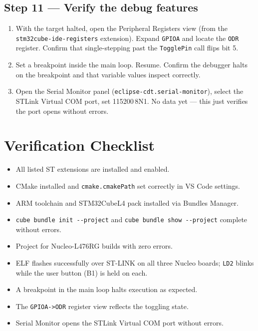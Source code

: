 \documentclass[11pt,letterpaper]{article}
\begin{document}

\newpage
\subsection{Step 11 --- Verify the debug features}
\begin{enumerate}[leftmargin=2em]
	\item With the target halted, open the Peripheral Registers view (from the \texttt{stm32cube-ide-registers} extension). Expand \texttt{GPIOA} and locate the \texttt{ODR} register. Confirm that single-stepping past the \texttt{TogglePin} call flips bit 5.
	\item Set a breakpoint inside the main loop. Resume. Confirm the debugger halts on the breakpoint and that variable values inspect correctly.
	\item Open the Serial Monitor panel (\texttt{eclipse-cdt.serial-monitor}), select the STLink Virtual COM port, set 115200\,8N1. No data yet --- this just verifies the port opens without errors.
\end{enumerate}

\section{Verification Checklist}
\begin{itemize}[leftmargin=2em]
	\item[$\square$] All listed ST extensions are installed and enabled.
	\item[$\square$] CMake installed and \texttt{cmake.cmakePath} set correctly in VS Code settings.
	\item[$\square$] ARM toolchain and STM32Cube\mbox{L4} \HAL{} pack installed via Bundles Manager.
	\item[$\square$] \texttt{cube bundle init -{}-project} and \texttt{cube bundle show -{}-project} complete without errors.
	\item[$\square$] Project for Nucleo-L476RG builds with zero errors.
	\item[$\square$] ELF flashes successfully over ST-LINK on all three Nucleo boards; \texttt{LD2} blinks while the user button (B1) is held on each.
	\item[$\square$] A breakpoint in the main loop halts execution as expected.
	\item[$\square$] The \texttt{GPIOA->ODR} register view reflects the toggling state.
	\item[$\square$] Serial Monitor opens the STLink Virtual COM port without errors.
\end{itemize}
\end{document}
